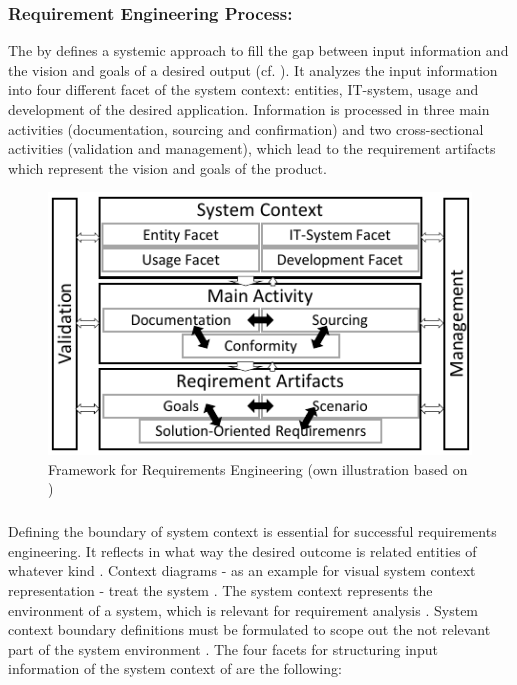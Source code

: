 \subsubsection{Requirement Engineering Process:} The by \textcite{Pohl.2007} defines a systemic approach to fill the gap between input information and the vision and goals of a desired output (cf. ). It analyzes the input information into four different facet of the system context: entities, IT-system, usage and development of the desired application. Information is processed in three main activities (documentation, sourcing and confirmation) and two cross-sectional activities (validation and management), which lead to the requirement artifacts which represent the vision and goals of the product. \parencite[cf.][38-39]{Pohl.2007}
\begin{figure}[H]
    \centering
    \includegraphics[scale=1.5]{img/ReqAnFrameWork.pdf}
    \caption[Framework for Requirements Engineering]{Framework for Requirements Engineering (own illustration based on \cite[41]{Pohl.2007})}
    \label{fig:reqFramework}
\end{figure}
\subparagraph{} Defining the boundary of system context is essential for successful requirements engineering. It reflects in what way the desired outcome is related entities of whatever kind \parencite[55]{Pohl.2007}. Context diagrams \parencites[cf.][266]{Kossiakoff.2011} - as an example for visual system context representation - treat the system  \parencite[76]{Lauesen.2008}. The system context represents the environment of a system, which is relevant for requirement analysis \parencite[55]{Pohl.2007}. System context boundary definitions must be formulated to scope out the not relevant part of the system environment \parencite[55-56]{Pohl.2007}. The four facets for structuring input information of the system context of \textcite{Pohl.2007} are the following:
